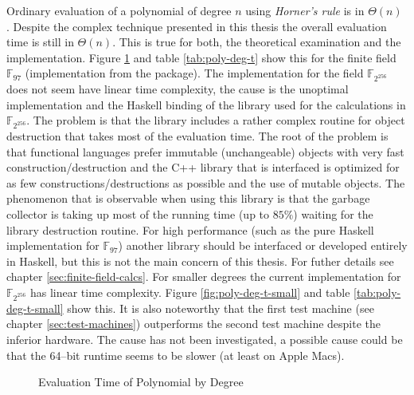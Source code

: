 %
%
\label{sec:comp-complexity}

Ordinary evaluation of a polynomial of degree $n$ using \emph{Horner's rule} is
in $\Theta(n)$ \cite{cormen01}. Despite the complex technique presented in this
thesis the overall evaluation time is still in $\Theta(n)$. This is true for
both, the theoretical examination and the implementation. Figure
\ref{fig:poly-deg-t} and table \ref{tab:poly-deg-t} show this for the finite
field $\mathbb{F}_{97}$ (implementation from the \JWTLhaskellForMaths{}
package). The implementation for the field $\mathbb{F}_{2^{256}}$ does not seem
have linear time complexity, the cause is the unoptimal implementation and the
Haskell binding of the library used for the calculations in
$\mathbb{F}_{2^{256}}$. The problem is that the library includes a rather
complex routine for object destruction that takes most of the evaluation time.
The root of the problem is that functional languages prefer immutable
(unchangeable) objects with very fast construction/destruction and the C++
library that is interfaced is optimized for as few constructions/destructions
as possible and the use of mutable objects. The phenomenon that is observable
when using this library is that the garbage collector is taking up most of the
running time (up to $85\%$) waiting for the library destruction routine. For
high performance (such as the pure Haskell implementation for $\mathbb{F}_{97}$)
another library should be interfaced or developed entirely in Haskell, but this
is not the main concern of this thesis. For futher details see chapter
\ref{sec:finite-field-calcs}. For smaller degrees the current implementation for
$\mathbb{F}_{2^{256}}$ has linear time complexity. Figure
\ref{fig:poly-deg-t-small} and table \ref{tab:poly-deg-t-small} show
this. It is also noteworthy that the first test machine (see chapter
\ref{sec:test-machines}) outperforms the second test machine despite the
inferior hardware. The cause has not been investigated, a possible cause could
be that the 64--bit \JWTghc{} runtime seems to be slower (at least on Apple
Macs)\cite{lentczner11}.


\begin{figure}[ht]
  \centering
  
  \caption{Evaluation Time of Polynomial by Degree}
  \label{fig:poly-deg-t}
\end{figure}

